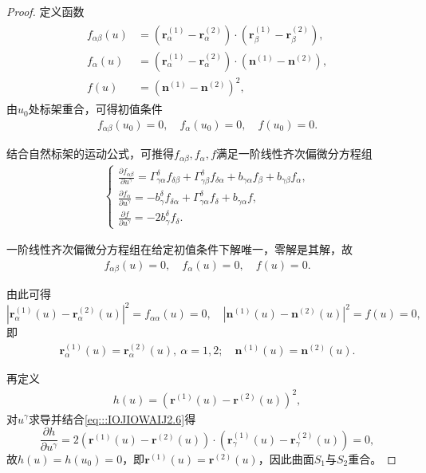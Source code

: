 \documentclass[../../main.tex]{subfiles}%
\begin{document}
\begin{proof}
定义函数
\begin{align}
\begin{split}
f_{\alpha\beta}(u) &= (\boldsymbol{r}_\alpha^{(1)} - \boldsymbol{r}_\alpha^{(2)}) \cdot (\boldsymbol{r}_\beta^{(1)} - \boldsymbol{r}_\beta^{(2)}),\\
f_\alpha(u) &= (\boldsymbol{r}_\alpha^{(1)} - \boldsymbol{r}_\alpha^{(2)}) \cdot (\boldsymbol{n}^{(1)} - \boldsymbol{n}^{(2)}),\\
f(u) &= (\boldsymbol{n}^{(1)} - \boldsymbol{n}^{(2)})^2,
\end{split}
\label{eq:::IOJIOWAIJ2.2}
\end{align}
由$u_0$处标架重合，可得初值条件
\begin{align}
f_{\alpha\beta}(u_0) = 0,\quad f_\alpha(u_0) = 0,\quad f(u_0) = 0.
\label{eq:::IOJIOWAIJ2.3}
\end{align}

结合自然标架的运动公式，可推得$f_{\alpha\beta},f_\alpha,f$满足一阶线性齐次偏微分方程组
\begin{align}
\begin{cases}
\displaystyle\frac{\partial f_{\alpha\beta}}{\partial u^\gamma} = \Gamma_{\gamma\alpha}^\delta f_{\delta\beta} + \Gamma_{\gamma\beta}^\delta f_{\delta\alpha} + b_{\gamma\alpha}f_\beta + b_{\gamma\beta}f_\alpha,\\[6pt]
\displaystyle\frac{\partial f_\alpha}{\partial u^\gamma} = -b_\gamma^\delta f_{\delta\alpha} + \Gamma_{\gamma\alpha}^\delta f_\delta + b_{\gamma\alpha}f,\\[6pt]
\displaystyle\frac{\partial f}{\partial u^\gamma} = -2b_\gamma^\delta f_\delta.
\end{cases}
\label{eq:::IOJIOWAIJ2.4}
\end{align}

一阶线性齐次偏微分方程组在给定初值条件下解唯一，零解是其解，故
\begin{align}
f_{\alpha\beta}(u) = 0,\quad f_\alpha(u) = 0,\quad f(u) = 0.
\label{eq:::IOJIOWAIJ2.5}
\end{align}

由此可得
$$|\boldsymbol{r}_\alpha^{(1)}(u) - \boldsymbol{r}_\alpha^{(2)}(u)|^2 = f_{\alpha\alpha}(u) = 0,\quad |\boldsymbol{n}^{(1)}(u) - \boldsymbol{n}^{(2)}(u)|^2 = f(u) = 0,$$
即
\begin{align}
\boldsymbol{r}_\alpha^{(1)}(u) = \boldsymbol{r}_\alpha^{(2)}(u),\ \alpha=1,2;\quad \boldsymbol{n}^{(1)}(u) = \boldsymbol{n}^{(2)}(u).
\label{eq:::IOJIOWAIJ2.6}
\end{align}

再定义
\begin{align}
h(u) = (\boldsymbol{r}^{(1)}(u) - \boldsymbol{r}^{(2)}(u))^2,
\label{eq:::IOJIOWAIJ2.7}
\end{align}
对$u^\gamma$求导并结合\eqref{eq:::IOJIOWAIJ2.6}得
$$\frac{\partial h}{\partial u^\gamma} = 2(\boldsymbol{r}^{(1)}(u) - \boldsymbol{r}^{(2)}(u)) \cdot (\boldsymbol{r}_\gamma^{(1)}(u) - \boldsymbol{r}_\gamma^{(2)}(u)) = 0,$$
故$h(u)=h(u_0)=0$，即$\boldsymbol{r}^{(1)}(u)=\boldsymbol{r}^{(2)}(u)$，因此曲面$S_1$与$S_2$重合。

\end{proof}
\end{document}
